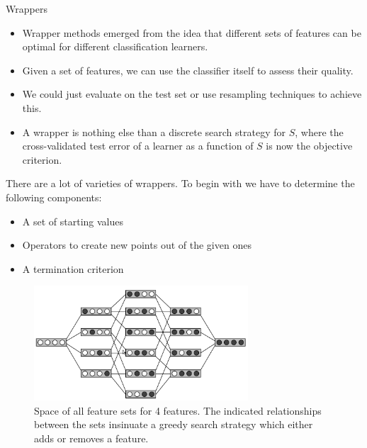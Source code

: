 \documentclass[11pt,compress,t,notes=noshow, xcolor=table]{beamer}
\begin{document}

  \begin{vbframe}{Wrappers}

    \begin{itemize}
      \item Wrapper methods emerged from the idea that different sets of features can be optimal for different classification learners.
      \item Given a set of features, we can use the classifier itself to assess their quality.
      \item We could just evaluate on the test set or use resampling techniques to achieve this.
      \item A wrapper is nothing else than a discrete search strategy for $S$, where the cross-validated test error of a learner as a function of $S$ is now the objective criterion.

    \end{itemize}


    \framebreak

    There are a lot of varieties of wrappers. To begin with we have to determine the following components:

    \lz

    \begin{itemize}
      \item A set of starting values
      \item Operators to create new points out of the given ones
      \item A termination criterion
    \end{itemize}

    \framebreak

    \begin{figure}
      \includegraphics[width=8cm]{figure_man/varsel_space.png}
      \caption{Space of all feature sets for 4 features.
      The indicated relationships between the sets insinuate a greedy search strategy which either adds or removes a feature.}
    \end{figure}


\end{vbframe}
\end{document}
